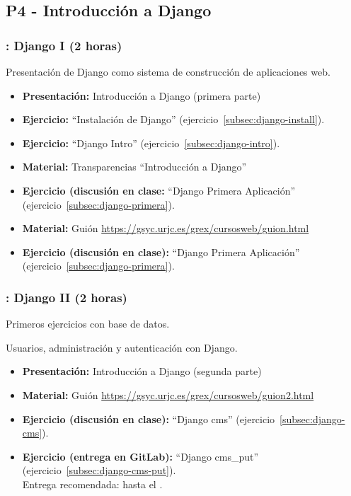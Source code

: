 \documentclass[a4paper,12pt]{article}
\begin{document}
\subsection{P4 - Introducción a Django}

\subsubsection{\juevesG: Django I (2 horas)}
\label{cal:juevesG}

Presentación de Django como sistema de construcción de aplicaciones web.

\begin{itemize}
 \item \textbf{Presentación:} Introducción a Django (primera parte)
 \item \textbf{Ejercicio:} ``Instalación de Django'' (ejercicio~\ref{subsec:django-install}).
 \item \textbf{Ejercicio:} ``Django Intro'' (ejercicio~\ref{subsec:django-intro}).
 \item \textbf{Material:} Transparencias ``Introducción a Django''
 \item \textbf{Ejercicio (discusión en clase:} ``Django Primera Aplicación'' (ejercicio~\ref{subsec:django-primera}).
 \item \textbf{Material:} Guión \url{https://gsyc.urjc.es/grex/cursosweb/guion.html}
 \item \textbf{Ejercicio (discusión en clase):} ``Django Primera Aplicación'' (ejercicio~\ref{subsec:django-primera}).

\end{itemize}


\subsubsection{\juevesH: Django II (2 horas)}
\label{cal:juevesH}

Primeros ejercicios con base de datos.

Usuarios, administración y autenticación con Django.

\begin{itemize}
 \item \textbf{Presentación:} Introducción a Django (segunda parte)
  \item \textbf{Material:} Guión \url{https://gsyc.urjc.es/grex/cursosweb/guion2.html}
 \item \textbf{Ejercicio  (discusión en clase):} ``Django cms'' (ejercicio~\ref{subsec:django-cms}). \\
 \item \textbf{Ejercicio (entrega en GitLab):} ``Django cms\_put'' (ejercicio~\ref{subsec:django-cms-put}). \\
  Entrega recomendada: hasta el \juevesJ.
\end{itemize}
\end{document}
